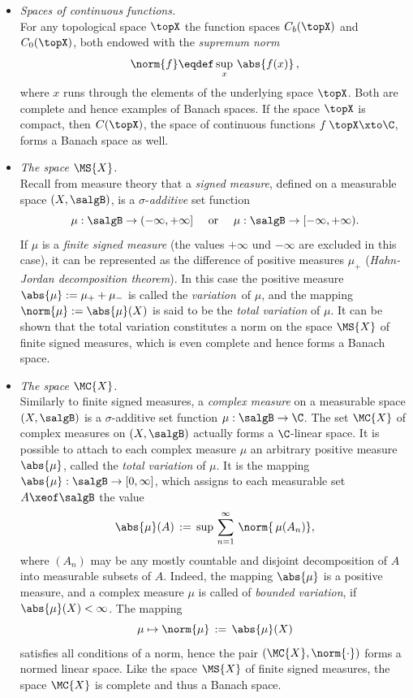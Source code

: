 \documentclass[11pt,twoside]{article}
\begin{document}
\begin{itemize}[leftmargin=12pt,itemsep=5pt]
\item[1.] \textit{Spaces of continuous functions.}\\
For any topological space $\topX$
the function spaces $C_b(\topX)$ and $C_0(\topX)$,
both endowed with the \textit{supremum norm}
\[
\norm{f} \eqdef \sup_x \, \abs{f(x)} \,,
\]
where $x$ runs through the elements of the underlying space $\topX$.
Both are complete and hence examples of Banach spaces.
If the space $\topX$ is compact,
then $C(\topX)$,
the space of continuous functions $f\:\topX \xto \C$,
forms a Banach space as well.

\item[2.] \textit{The space $\MS{X}$.}\\
Recall from measure theory
that a \textit{signed measure},
defined on a measurable space $(X,\salgB)$,
is a $\sigma$-\textit{additive} set function
\[
\mu: \salgB \to (-\infty,+ \infty] \quad \mbox{ or } \quad
\mu: \salgB \to [-\infty,+ \infty).
\]
If $\mu$ is a \textit{finite signed measure}
(the values $+\infty$ und $-\infty$ are excluded in this case),
it can be represented as the difference of positive measures $\mu_+$
(\textit{Hahn-Jordan decomposition theorem}).
In this case
the positive measure $\abs{\mu} := \mu_+ + \mu_-$ is called the
\textit{variation}\ of $\mu$,
and the mapping $\norm{\mu} := \abs{\mu} (X)$ is said to be
the \textit{total variation} of $\mu$.
It can be shown 
that the total variation constitutes a norm on the space $\MS{X}$
of finite signed measures,
which is even complete and hence forms a Banach space.

\item[3.] \textit{The space $\MC{X}$.}\\
Similarly to finite signed measures,
a \textit{complex measure} on a measurable space $(X,\salgB)$
is a $\sigma$-additive set function $\mu:\salgB \to \C$.
The set $\MC{X}$ of complex measures on $(X,\salgB)$
actually forms a $\C$-linear space.
It is possible to attach to each complex measure $\mu$
an arbitrary positive measure $\abs{\mu} $,
called the \textit{total variation} of $\mu$.
It is the mapping
$\abs{\mu} :\salgB \to [0,\infty]$,
which assigns to each measurable set $A \xeof \salgB$ the value
\[
\abs{\mu} (A)
\, := \,
\sup \, \sum_{n=1}^{\infty} \, \norm{\,\mu(A_n)},
\]
where $(A_n)$ may be any mostly countable and disjoint decomposition
of $A$ into measurable subsets of $A$.
Indeed,
the mapping $\abs{\mu} $ is a positive measure,
and a complex measure $\mu$ is called of \textit{bounded variation},
if $\abs{\mu} (X) < \infty$.
The mapping 
\[
\mu \mapsto \norm{\mu}
\, := \,
\abs{\mu} (X)
\]
satisfies all conditions of a norm,
hence the pair $(\MC{X} ,\norm{\cdot})$ forms a normed linear space.
Like the space $\MS{X}$ of finite signed measures,
the space $\MC{X}$ is complete and thus a Banach space.


\end{itemize}
\end{document}

